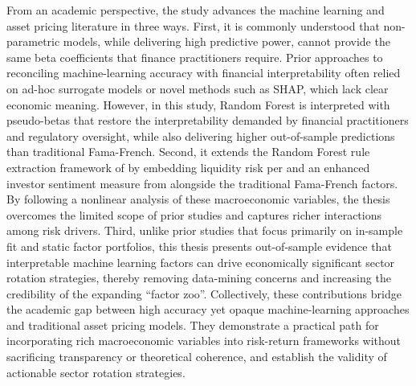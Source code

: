 From an academic perspective, the study advances the machine learning and asset pricing literature in three ways. First, it is commonly understood that non-parametric models, while delivering high predictive power, cannot provide the same beta coefficients that finance practitioners require. Prior approaches to reconciling machine-learning accuracy with financial interpretability often relied on ad-hoc surrogate models or novel methods such as SHAP, which lack clear economic meaning. However, in this study, Random Forest is interpreted with pseudo-betas that restore the interpretability demanded by financial practitioners and regulatory oversight, while also delivering higher out-of-sample predictions than traditional Fama-French. Second, it extends the Random Forest rule extraction framework of  by embedding liquidity risk per  and an enhanced investor sentiment measure from  alongside the traditional Fama-French factors. By following a nonlinear analysis of these macroeconomic variables, the thesis overcomes the limited scope of prior studies and captures richer interactions among risk drivers. Third, unlike prior studies that focus primarily on in-sample fit and static factor portfolios, this thesis presents out-of-sample evidence that interpretable machine learning factors can drive economically significant sector rotation strategies, thereby removing data-mining concerns and increasing the credibility of the expanding “factor zoo”. Collectively, these contributions bridge the academic gap between high accuracy yet opaque machine-learning approaches and traditional asset pricing models. They demonstrate a practical path for incorporating rich macroeconomic variables into risk-return frameworks without sacrificing transparency or theoretical coherence, and establish the validity of actionable sector rotation strategies.


